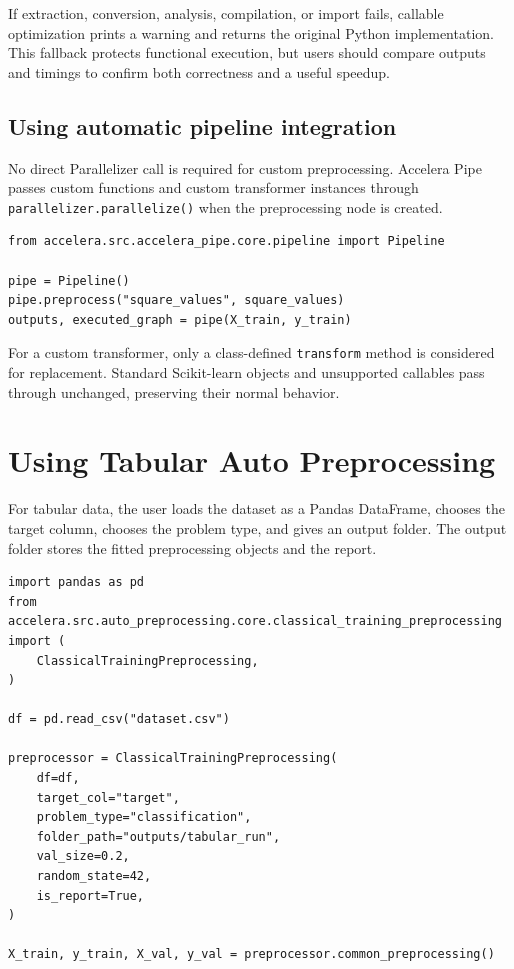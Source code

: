 \documentclass[12pt,a4paper]{report}
\begin{document}
If extraction, conversion, analysis, compilation, or import fails, callable
optimization prints a warning and returns the original Python implementation.
This fallback protects functional execution, but users should compare outputs
and timings to confirm both correctness and a useful speedup.

\subsection{Using automatic pipeline integration}
No direct Parallelizer call is required for custom preprocessing. Accelera Pipe
passes custom functions and custom transformer instances through
\texttt{parallelizer.parallelize()} when the preprocessing node is created.

\begin{lstlisting}[style=code,caption={Adding an automatically optimized custom function}]
from accelera.src.accelera_pipe.core.pipeline import Pipeline

pipe = Pipeline()
pipe.preprocess("square_values", square_values)
outputs, executed_graph = pipe(X_train, y_train)
\end{lstlisting}

For a custom transformer, only a class-defined \texttt{transform} method is
considered for replacement. Standard Scikit-learn objects and unsupported
callables pass through unchanged, preserving their normal behavior.

\section{Using Tabular Auto Preprocessing}

For tabular data, the user loads the dataset as a Pandas DataFrame, chooses the
target column, chooses the problem type, and gives an output folder. The output
folder stores the fitted preprocessing objects and the report.

\begin{lstlisting}[style=code,caption={Calling tabular training preprocessing}]
import pandas as pd
from accelera.src.auto_preprocessing.core.classical_training_preprocessing import (
    ClassicalTrainingPreprocessing,
)

df = pd.read_csv("dataset.csv")

preprocessor = ClassicalTrainingPreprocessing(
    df=df,
    target_col="target",
    problem_type="classification",
    folder_path="outputs/tabular_run",
    val_size=0.2,
    random_state=42,
    is_report=True,
)

X_train, y_train, X_val, y_val = preprocessor.common_preprocessing()
\end{lstlisting}
\end{document}
